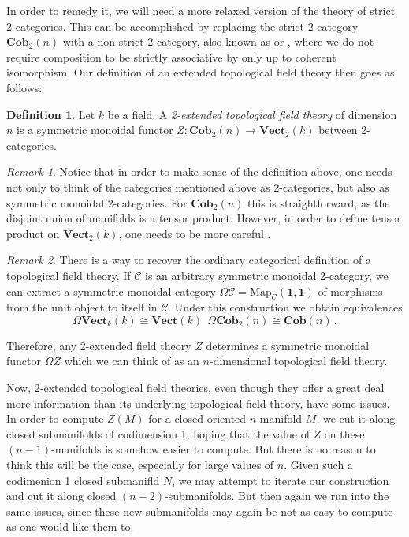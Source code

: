 \documentclass[a4paper,11pt]{article}
\newcommand{\ccal}{\mathcal{C}}
\newcommand{\vecto}{\mathbf{Vect}}
\theoremstyle{plain}
\theoremstyle{definition}
\newtheorem{defi}[thm]{Definition}
\theoremstyle{remark}
\newtheorem*{rem}{Remark}
\begin{document}
In order to remedy it, we will need a more relaxed version of the theory of strict 2-categories. This can be accomplished by replacing the strict $2$-category $\textbf{Cob}_2(n)$ with a non-strict 2-category, also known as  or , where we do not require composition to be strictly associative by only up to coherent isomorphism. Our definition of an extended topological field theory then goes as follows:

\begin{defi}
Let $k$ be a field. A \textit{2-extended topological field theory} of dimension $n$ is a symmetric monoidal functor $Z \colon \textbf{Cob}_2(n) \to \vecto_2(k)$ between 2-categories.
\end{defi}

\begin{rem}
Notice that in order to make sense of the definition above, one needs not only to think of the categories mentioned above as 2-categories, but also as symmetric monoidal 2-categories. For $\textbf{Cob}_2(n)$ this is straightforward, as the disjoint union of manifolds is a tensor product. However, in order to define tensor product on $\vecto_2(k)$, one needs to be more careful .
\end{rem}


\begin{rem}
There is a way to recover the ordinary categorical definition of a topological field theory. If $\ccal$ is an arbitrary symmetric monoidal 2-category, we can extract a symmetric monoidal category $\Omega \ccal = \text{Map}_{\ccal}(\mathbf{1}, \mathbf{1})$ of morphisms from the unit object to itself in $\ccal$. Under this construction we obtain equivalences 
$$\Omega \vecto_k(k) \cong \vecto(k) \, \; \Omega \textbf{Cob}_2(n) \cong \textbf{Cob}(n) \, .$$

Therefore, any 2-extended field theory $Z$ determines a symmetric monoidal functor $\Omega Z$ which we can think of as an $n$-dimensional topological field theory.
\end{rem}

Now, 2-extended topological field theories, even though they offer a great deal more information than its underlying topological field theory, have some issues. In order to compute $Z(M)$ for a closed oriented $n$-manifold $M$, we cut it along closed submanifolds of codimension 1, hoping that the value of $Z$ on these $(n-1)$-manifolds is somehow easier to compute. But there is no reason to think this will be the case, especially for large values of $n$. Given such a codimenion 1 closed submanifld $N$, we may attempt to iterate our construction and cut it along closed $(n-2)$-submanifolds. But then again we run into the same issues, since these new submanifolds may again be not as easy to compute as one would like them to.
\end{document}
